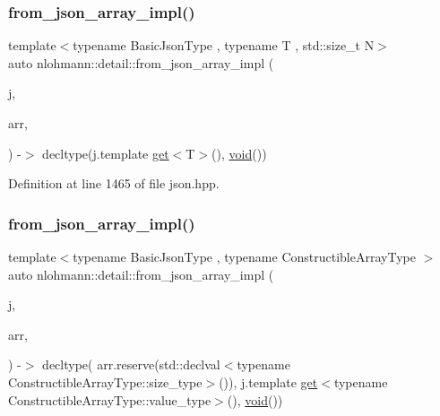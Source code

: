 \subsubsection{\texorpdfstring{from\_json\_array\_impl()}{from\_json\_array\_impl()}\hspace{0.1cm}{\footnotesize\ttfamily [2/4]}}
{\footnotesize\ttfamily template$<$typename Basic\+Json\+Type , typename T , std\+::size\+\_\+t N$>$ \\
auto nlohmann\+::detail\+::from\+\_\+json\+\_\+array\+\_\+impl (\begin{DoxyParamCaption}\item[{const Basic\+Json\+Type \&}]{j,  }\item[{\mbox{\hyperlink{namespacenlohmann_1_1detail_a1ed8fc6239da25abcaf681d30ace4985af1f713c9e000f5d3f280adbd124df4f5}{std\+::array}}$<$ T, N $>$ \&}]{arr,  }\item[{\mbox{\hyperlink{structnlohmann_1_1detail_1_1priority__tag}{priority\+\_\+tag}}$<$ 2 $>$}]{ }\end{DoxyParamCaption}) -\/$>$ decltype(j.\+template \mbox{\hyperlink{namespacenlohmann_1_1detail_acc422c11342b31368f610b6f96fcedc6}{get}}$<$T$>$(), \mbox{\hyperlink{namespacenlohmann_1_1detail_a59fca69799f6b9e366710cb9043aa77d}{void}}())
}



Definition at line 1465 of file json.\+hpp.

\mbox{\label{namespacenlohmann_1_1detail_a464e1246f3df7edea79c3f81ab701edd}} 
\subsubsection{\texorpdfstring{from\_json\_array\_impl()}{from\_json\_array\_impl()}\hspace{0.1cm}{\footnotesize\ttfamily [3/4]}}
{\footnotesize\ttfamily template$<$typename Basic\+Json\+Type , typename Constructible\+Array\+Type $>$ \\
auto nlohmann\+::detail\+::from\+\_\+json\+\_\+array\+\_\+impl (\begin{DoxyParamCaption}\item[{const Basic\+Json\+Type \&}]{j,  }\item[{Constructible\+Array\+Type \&}]{arr,  }\item[{\mbox{\hyperlink{structnlohmann_1_1detail_1_1priority__tag}{priority\+\_\+tag}}$<$ 1 $>$}]{ }\end{DoxyParamCaption}) -\/$>$ decltype(
    arr.\+reserve(std\+::declval$<$typename Constructible\+Array\+Type\+::size\+\_\+type$>$()),
    j.\+template \mbox{\hyperlink{namespacenlohmann_1_1detail_acc422c11342b31368f610b6f96fcedc6}{get}}$<$typename Constructible\+Array\+Type\+::value\+\_\+type$>$(),
    \mbox{\hyperlink{namespacenlohmann_1_1detail_a59fca69799f6b9e366710cb9043aa77d}{void}}())
}



